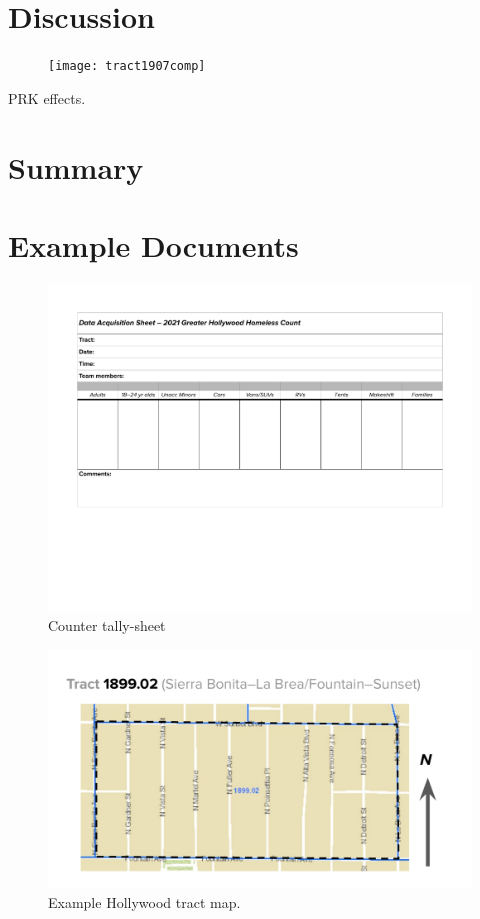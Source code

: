 \documentclass[11pt,twocolumn]{article}
\begin{document}
\section{Discussion}
\label{sec:discussion}

\begin{figure}[]
	\centering
	\texttt{[image: tract1907comp]}
	\caption{}
\end{figure}

PRK effects.

\section{Summary}
\label{sec:summary}

\appendix

\section{Example Documents}

\begin{figure}
	\centering
	\includegraphics[width =\linewidth]{Hollywood2021CountDataSheet}
	\caption{Counter tally-sheet}
\end{figure}

\begin{figure}
	\centering
	\includegraphics[width =\linewidth]{tractMap}
	\caption{Example Hollywood tract map.}
\end{figure}
\end{document}
